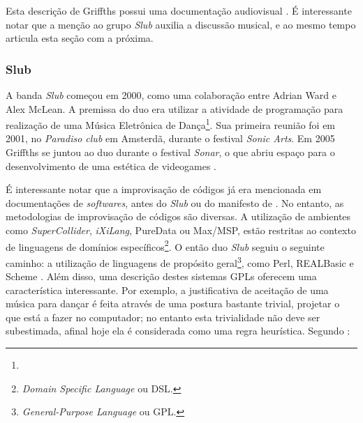 Esta descrição de Griffths possui uma documentação audiovisual . É interessante notar que a menção ao grupo \emph{Slub} auxilia a discussão musical, e ao mesmo tempo articula esta seção com a próxima. 

\subsubsection{Slub}

A banda \emph{Slub} começou em 2000, como uma colaboração entre Adrian Ward e Alex McLean. A premissa do duo era utilizar a atividade de programação para realização de uma Música Eletrônica de Dança\footnote{}. Sua primeira reunião foi em 2001, no \emph{Paradiso club} em Amsterdã, durante o festival \emph{Sonic Arts}. Em 2005 Griffths se juntou ao duo durante o festival \emph{Sonar}, o que abriu espaço para o desenvolvimento de uma estética de videogames \cite[p.~138--140]{McLean2011}.

É interessante notar que a improvisação de códigos já era mencionada em documentações de \emph{softwares}, antes do \emph{Slub} ou do manifesto de . No entanto, as metodologias de improvisação de códigos são diversas. A utilização de ambientes como \emph{SuperCollider}, \emph{iXiLang}, PureData ou Max/MSP, estão restritas ao contexto de linguagens de domínios específicos\footnote{\emph{Domain Specific Language} ou DSL.}. O então duo \emph{Slub} seguiu o seguinte caminho: a utilização de linguagens de propósito geral\footnote{\emph{General-Purpose Language} ou GPL.}, como Perl, REALBasic e Scheme . Além disso, uma descrição destes sistemas GPLs oferecem uma característica interessante. Por exemplo, a justificativa de aceitação de uma música para dançar  é feita através de uma postura bastante trivial, projetar o que está a fazer no computador; no entanto esta trivialidade não deve ser subestimada, afinal hoje ela é considerada como uma regra heurística. Segundo :


